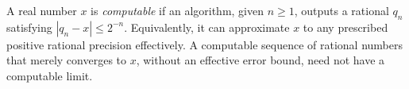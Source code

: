 
A real number $x$ is \emph{computable} if an algorithm, given $n\ge1$, outputs a rational $q_n$ satisfying $|q_n-x|\le2^{-n}$. Equivalently, it can approximate $x$ to any prescribed positive rational precision effectively. A computable sequence of rational numbers that merely converges to $x$, without an effective error bound, need not have a computable limit.
